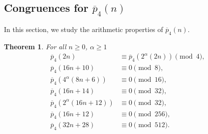 \documentclass[11pt, reqno]{amsart}
\newtheorem{theorem}{Theorem}[section]
\numberwithin{equation}{section}
\begin{document}
	\subsection{Congruences for $\overline{p}_{4}(n)$}
	In this section, we study the arithmetic properties of $\overline{p}_{4}(n)$.
	\begin{theorem}For all $n\geq0$, $\alpha\geq1$
		\begin{align}
			\overline{p}_{4}(2n)&\equiv\overline{p}_{4}(2^{\alpha}(2n))  \pmod{4},\\
			\overline{p}_{4}(16n+10)&\equiv 0 \pmod{8},\\
			\overline{p}_{4}(4^{\alpha}(8n+6))&\equiv 0 \pmod{16},\\
			\overline{p}_{4}(16n+14)&\equiv 0 \pmod{32},\\
			\overline{p}_{4}(2^{\alpha}(16n+12))&\equiv 0 \pmod{32},\\
			\overline{p}_{4}(16n+12)&\equiv 0 \pmod{256},\\
			\overline{p}_{4}(32n+28)&\equiv 0 \pmod{512}.
		\end{align}
	\end{theorem}
\end{document}
